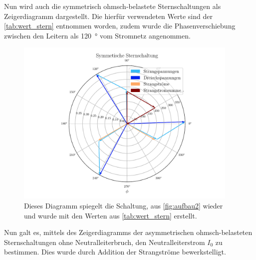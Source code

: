 \documentclass[12pt,english,ngerman]{scrartcl}
\begin{document}
Nun wird auch die symmetrisch ohmsch-belastete Sternschaltungen als
Zeigerdiagramm dargestellt. Die hierfür verwendeten Werte sind der
\autoref{tab:wert_stern} entnommen worden, zudem wurde die Phasenverschiebung
zwischen den Leitern als \SI{120}{\degree} vom Stromnetz angenommen.

\begin{figure}[H]
	\begin{center}
		\includegraphics[width = 0.95\textwidth]{figures/zeigerSternSym.pdf}
	\end{center}
	\caption[Zeigerdiagramm einer symmetrisch ohmsch-belastete Sternschaltung]{Dieses
		Diagramm spiegelt die Schaltung, aus \autoref{fig:aufbau2} wieder und wurde mit
		den Werten aus \autoref{tab:wert_stern} erstellt.
	}\label{fig:zeigerSternSym}
\end{figure}

Nun galt es, mittels des Zeigerdiagramms der asymmetrischen ohmsch-belasteten
Sternschaltungen ohne Neutralleiterbruch, den Neutralleiterstrom $I_0$ zu
bestimmen. Dies wurde durch Addition der Strangströme bewerkstelligt.
\end{document}
